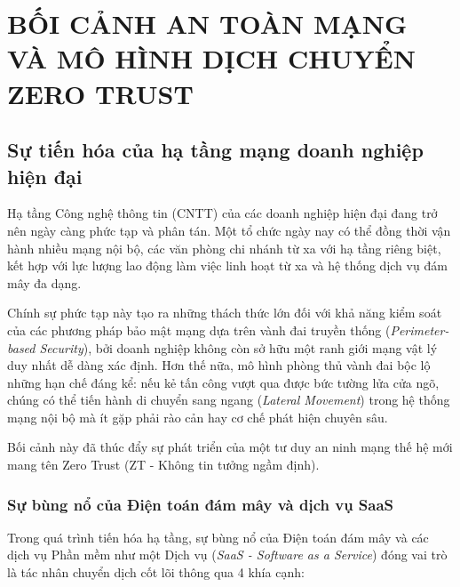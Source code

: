 \chapter{BỐI CẢNH AN TOÀN MẠNG VÀ MÔ HÌNH DỊCH CHUYỂN ZERO TRUST}
\label{chap:1}

\section{Sự tiến hóa của hạ tầng mạng doanh nghiệp hiện đại}
\label{sec:1_1}

Hạ tầng Công nghệ thông tin (CNTT) của các doanh nghiệp hiện đại đang trở nên ngày càng phức tạp và phân tán. Một tổ chức ngày nay có thể đồng thời vận hành nhiều mạng nội bộ, các văn phòng chi nhánh từ xa với hạ tầng riêng biệt, kết hợp với lực lượng lao động làm việc linh hoạt từ xa và hệ thống dịch vụ đám mây đa dạng.

Chính sự phức tạp này tạo ra những thách thức lớn đối với khả năng kiểm soát của các phương pháp bảo mật mạng dựa trên vành đai truyền thống (\textit{Perimeter-based Security}), bởi doanh nghiệp không còn sở hữu một ranh giới mạng vật lý duy nhất dễ dàng xác định. Hơn thế nữa, mô hình phòng thủ vành đai bộc lộ những hạn chế đáng kể: nếu kẻ tấn công vượt qua được bức tường lửa cửa ngõ, chúng có thể tiến hành di chuyển sang ngang (\textit{Lateral Movement}) trong hệ thống mạng nội bộ mà ít gặp phải rào cản hay cơ chế phát hiện chuyên sâu.

Bối cảnh này đã thúc đẩy sự phát triển của một tư duy an ninh mạng thế hệ mới mang tên Zero Trust (ZT - Không tin tưởng ngầm định).

\subsection{Sự bùng nổ của Điện toán đám mây và dịch vụ SaaS}
\label{subsec:1_1_1}

Trong quá trình tiến hóa hạ tầng, sự bùng nổ của Điện toán đám mây và các dịch vụ Phần mềm như một Dịch vụ (\textit{SaaS - Software as a Service}) đóng vai trò là tác nhân chuyển dịch cốt lõi thông qua 4 khía cạnh:

